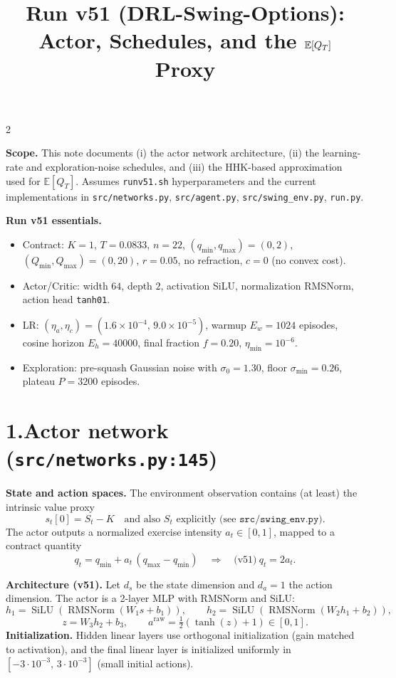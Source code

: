 \documentclass[10pt]{article}
\title{\vspace{-1.2em}Run v51 (DRL-Swing-Options): Actor, Schedules, and the \texorpdfstring{$\E[Q_T]$}{E[Q_T]} Proxy\vspace{-0.6em}}
\author{\vspace{-1.2em}}
\date{\vspace{-1.6em}}
\newenvironment{tightitemize}{%
  \begin{itemize}
  \setlength{\itemsep}{0pt}%
  \setlength{\parskip}{0pt}%
  \setlength{\parsep}{0pt}%
  \setlength{\topsep}{0pt}%
  \setlength{\partopsep}{0pt}%
}{\end{itemize}}
\newcommand{\code}[1]{\texttt{#1}}
\newcommand{\E}{\mathbb{E}}
\newcommand{\1}{\mathbf{1}}
\begin{document}
\small
\maketitle
\vspace{-0.8em}

\begin{multicols}{2}

\textbf{Scope.} This note documents (i) the actor network architecture, (ii) the learning-rate and exploration-noise schedules, and (iii) the HHK-based approximation used for $\E[Q_T]$. Assumes \code{runv51.sh} hyperparameters and the current implementations in \code{src/networks.py}, \code{src/agent.py}, \code{src/swing\_env.py}, \code{run.py}.

\vspace{0.2em}
\textbf{Run v51 essentials.}
\begin{tightitemize}
  \item Contract: $K{=}1$, $T{=}0.0833$, $n{=}22$, $(q_{\min},q_{\max}){=}(0,2)$, $(Q_{\min},Q_{\max}){=}(0,20)$, $r{=}0.05$, no refraction, $c{=}0$ (no convex cost).
  \item Actor/Critic: width $64$, depth $2$, activation SiLU, normalization RMSNorm, action head \texttt{tanh01}.
  \item LR: $(\eta_a,\eta_c)=(1.6{\times}10^{-4},\,9.0{\times}10^{-5})$, warmup $E_w{=}1024$ episodes, cosine horizon $E_h{=}40000$, final fraction $f{=}0.20$, $\eta_{\min}{=}10^{-6}$.
  \item Exploration: pre-squash Gaussian noise with $\sigma_0{=}1.30$, floor $\sigma_{\min}{=}0.26$, plateau $P{=}3200$ episodes.
\end{tightitemize}

\section*{1.\;Actor network (\code{src/networks.py:145})}
\textbf{State and action spaces.} The environment observation contains (at least) the intrinsic value proxy
\[
s_t[0] = S_t - K
\quad\text{and also }S_t\text{ explicitly (see }\code{src/swing\_env.py}\text{).}
\]
The actor outputs a normalized exercise intensity $a_t\in[0,1]$, mapped to a contract quantity
\[
q_t = q_{\min} + a_t\,(q_{\max}-q_{\min})
\quad\Rightarrow\quad
\text{(v51)}~q_t = 2a_t.
\]

\textbf{Architecture (v51).} Let $d_s$ be the state dimension and $d_a{=}1$ the action dimension. The actor is a 2-layer MLP with RMSNorm and SiLU:
\[
h_1 = \operatorname{SiLU}(\operatorname{RMSNorm}(W_1 s + b_1)),\qquad
h_2 = \operatorname{SiLU}(\operatorname{RMSNorm}(W_2 h_1 + b_2)),
\]
\[
z = W_3 h_2 + b_3,\qquad
a^{\text{raw}} = \tfrac12(\tanh(z)+1)\in[0,1].
\]
\textbf{Initialization.} Hidden linear layers use orthogonal initialization (gain matched to activation), and the final linear layer is initialized uniformly in $[-3\cdot 10^{-3},\,3\cdot 10^{-3}]$ (small initial actions).


\end{multicols}
\end{document}
